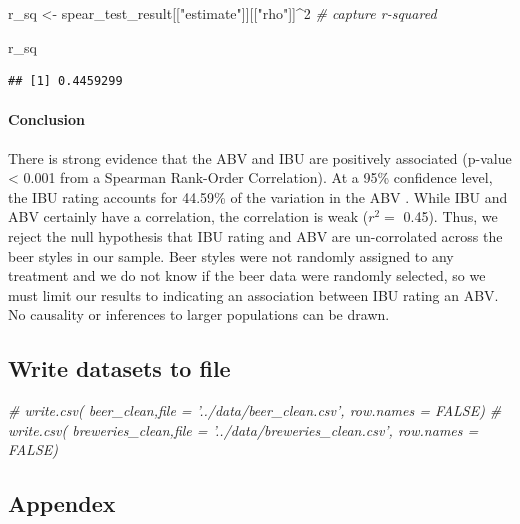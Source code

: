 \documentclass[]{article}
\newenvironment{Shaded}{\begin{snugshade}}{\end{snugshade}}
\newcommand{\DecValTok}[1]{\textcolor[rgb]{0.00,0.00,0.81}{#1}}
\newcommand{\StringTok}[1]{\textcolor[rgb]{0.31,0.60,0.02}{#1}}
\newcommand{\CommentTok}[1]{\textcolor[rgb]{0.56,0.35,0.01}{\textit{#1}}}
\newcommand{\OperatorTok}[1]{\textcolor[rgb]{0.81,0.36,0.00}{\textbf{#1}}}
\newcommand{\NormalTok}[1]{#1}
\let\oldparagraph\paragraph
\renewcommand{\paragraph}[1]{\oldparagraph{#1}\mbox{}}
\begin{document}
\begin{Shaded}
\begin{Highlighting}[]
\NormalTok{r_sq <-}\StringTok{ }\NormalTok{spear_test_result[[}\StringTok{"estimate"}\NormalTok{]][[}\StringTok{"rho"}\NormalTok{]]}\OperatorTok{^}\DecValTok{2} \CommentTok{# capture r-squared}

\NormalTok{r_sq}
\end{Highlighting}
\end{Shaded}

\begin{verbatim}
## [1] 0.4459299
\end{verbatim}

\paragraph{Conclusion}\label{conclusion}

There is strong evidence that the ABV and IBU are positively associated
(p-value \textless{} 0.001 from a Spearman Rank-Order Correlation). At a
95\% confidence level, the IBU rating accounts for 44.59\% of the
variation in the ABV . While IBU and ABV certainly have a correlation,
the correlation is weak (\(r^2 =\) 0.45). Thus, we reject the null
hypothesis that IBU rating and ABV are un-corrolated across the beer
styles in our sample. Beer styles were not randomly assigned to any
treatment and we do not know if the beer data were randomly selected, so
we must limit our results to indicating an association between IBU
rating an ABV. No causality or inferences to larger populations can be
drawn.

\subsection{Write datasets to file}\label{write-datasets-to-file}

\begin{Shaded}
\begin{Highlighting}[]
\CommentTok{# write.csv( beer_clean,file = '../data/beer_clean.csv', row.names = FALSE)}
\CommentTok{# write.csv( breweries_clean,file = '../data/breweries_clean.csv', row.names = FALSE)}
\end{Highlighting}
\end{Shaded}

\subsection{Appendex}\label{appendex}
\end{document}
